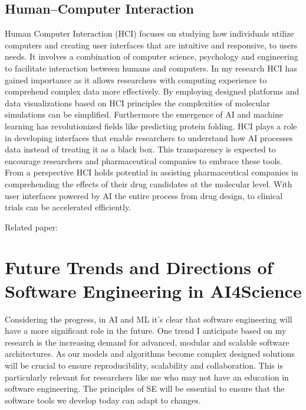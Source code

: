 \documentclass[11pt,a4paper]{article}
\begin{document}
\subsection{Human--Computer Interaction}
Human Computer Interaction (HCI) focuses on studying how individuals utilize computers and creating user interfaces that are intuitive and responsive, to users needs. It involves a combination of computer science, psychology and engineering to facilitate interaction between humans and computers.
In my research HCI has gained importance as it allows researchers with computing experience to comprehend complex data more effectively. By employing designed platforms and data visualizations based on HCI principles the complexities of molecular simulations can be simplified.
Furthermore the emergence of AI and machine learning has revolutionized fields like predicting protein folding. HCI plays a role in developing interfaces that enable researchers to understand how AI processes data instead of treating it as a black box. This transparency is expected to encourage researchers and pharmaceutical companies to embrace these tools.
From a perspective HCI holds potential in assisting pharmaceutical companies in comprehending the effects of their drug candidates at the molecular level. With user interfaces powered by AI the entire process from drug design, to clinical trials can be accelerated efficiently.

Related paper:\\
\noindent{}

\section{Future Trends and Directions of Software Engineering in AI4Science}

Considering the progress, in AI and ML it's clear that software engineering will have a more significant role in the future. One trend I anticipate based on my research is the increasing demand for advanced, modular and scalable software architectures. As our models and algorithms become complex designed solutions will be crucial to ensure reproducibility, scalability and collaboration. This is particularly relevant for researchers like me who may not have an education in software engineering. The principles of SE will be essential to ensure that the software tools we develop today can adapt to changes.
\end{document}
